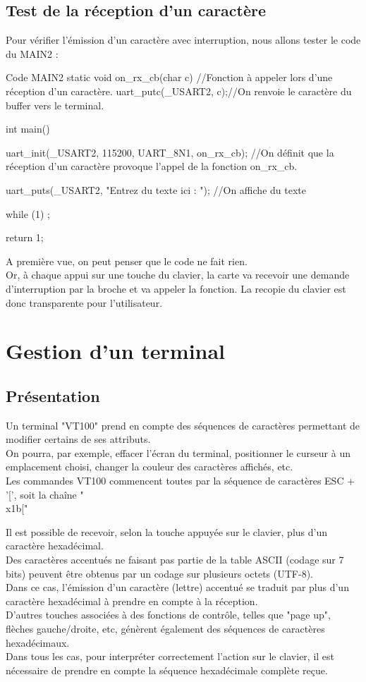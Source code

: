 {\section{Test de la réception d'un caractère}


Pour vérifier l'émission d'un caractère avec interruption, nous allons tester le code du MAIN2 : 

\begin{Cpp}{Code MAIN2}
static void on_rx_cb(char c) //Fonction à appeler lors d'une réception d'un caractère.
{
	uart_putc(_USART2, c);//On renvoie le caractère du buffer vers le terminal.
}

int main()
{
	uart_init(_USART2, 115200, UART_8N1, on_rx_cb);
	//On définit que la réception d'un caractère provoque l'appel de la fonction on_rx_cb.

	uart_puts(_USART2, "Entrez du texte ici : "); //On affiche du texte

	while (1) ;

	return 1;
}
\end{Cpp}

A première vue, on peut penser que le code ne fait rien.\\
Or, à chaque appui sur une touche du clavier, la carte va recevoir une demande d'interruption par la broche  et va appeler la fonction. La recopie du clavier est donc transparente pour l'utilisateur.

\chapter{Gestion d'un terminal}

\section{Présentation}

Un terminal "VT100" prend en compte des séquences de caractères permettant de modifier certains de ses attributs.\\
On pourra, par exemple, effacer l'écran du terminal, positionner le curseur à un emplacement choisi, changer la couleur des caractères affichés, etc.\\
Les commandes VT100 commencent toutes par la séquence de caractères ESC + '[', soit la chaîne "\\x1b["

Il est possible de recevoir, selon la touche appuyée sur le clavier, plus d'un caractère hexadécimal.\\
Des caractères accentués ne faisant pas partie de la table ASCII (codage sur 7 bits) peuvent être obtenus par un codage sur plusieurs octets (UTF-8).\\
Dans ce cas, l'émission d'un caractère (lettre) accentué se traduit par plus d'un caractère hexadécimal à prendre en compte à la réception.\\
D'autres touches associées à des fonctions de contrôle, telles que "page up", flèches gauche/droite, etc, génèrent également des séquences de caractères hexadécimaux.\\
Dans tous les cas, pour interpréter correctement l'action sur le clavier, il est nécessaire de prendre en compte la séquence hexadécimale complète reçue.

}
